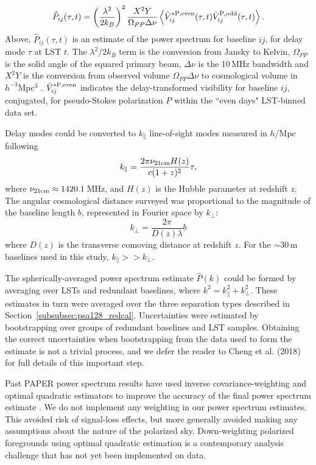 \begin{equation}
\hat{P}_{ij}(\tau, t) = \left(\frac{\lambda^2}{2k_B}\right)^2 \frac{X^2Y}{\Omega_{PP}\Delta\nu} \left\langle \tilde{V}^{\rm* P, even}_{ij}(\tau,t) \tilde{V}^{\rm P, odd}_{ij}(\tau,t) \right\rangle.
\end{equation}
Above, $\hat{P}_{ij}(\tau, t)$ is an estimate of the power spectrum for baseline $ij$, for delay mode $\tau$ at LST $t$. The $\lambda^2/2k_B$ term is the conversion from Jansky to Kelvin, $\Omega_{PP}$ is the solid angle of the squared primary beam, $\Delta\nu$ is the 10\,MHz bandwidth and $X^2Y$ is the conversion from observed volume $\Omega_{PP}\Delta\nu$ to cosmological volume in $h^{-3}$Mpc$^3$ \citep{Parsons.12b}. $\tilde{V}^{\rm* P, even}_{ij}$ indicates the delay-transformed visibility for baseline $ij$, conjugated, for pseudo-Stokes polarization $P$ within the ``even days" LST-binned data set.

Delay modes could be converted to $k_{\parallel}$ line-of-sight modes measured in $h$/Mpc following
\begin{equation}
k_{\parallel} = \frac{2\pi \nu_{\rm 21cm} H(z)}{c(1+z)^2}\tau,
\end{equation}
where $\nu_{\rm 21cm}\approx1420.1$\,MHz, and $H(z)$ is the Hubble parameter at redshift $z$. The angular cosmological distance surveyed was proportional to the magnitude of the baseline length $b$, represented in Fourier space by $k_{\perp}$:
\begin{equation}
k_{\perp} = \frac{2\pi}{D(z)\lambda}b
\end{equation}
where $D(z)$ is the transverse comoving distance at redshift $z$. For the $\sim$30\,m baselines used in this study, $k_{\parallel}>>k_{\perp}$. 

The spherically-averaged power spectrum estimate $\hat{P}(k)$ could be formed by averaging over LSTs and redundant baselines, where $k^2 = k_{\parallel}^2 + k_{\perp}^2$. These estimates in turn were averaged over the three separation types described in Section~\ref{subsubsec:psa128_redcal}. Uncertainties were estimated by bootstrapping over groups of redundant baselines and LST samples. Obtaining the correct uncertainties when bootstrapping from the data used to form the estimate is not a trivial process, and we defer the reader to {\color{red} Cheng et al. (2018)} for full details of this important step. 

Past PAPER power spectrum results have used inverse covariance-weighting and optimal quadratic estimators to improve the accuracy of the final power spectrum estimate \citep[e.g.][{\color{red}; Cheng et al. 2018}]{Parsons.14}. We do not implement any weighting in our power spectrum estimates. This avoided risk of signal-loss effects, but more generally avoided making any assumptions about the nature of the polarized sky. Down-weighting polarized foregrounds using optimal quadratic estimation is a contemporary analysis challenge that has not yet been implemented on data.

